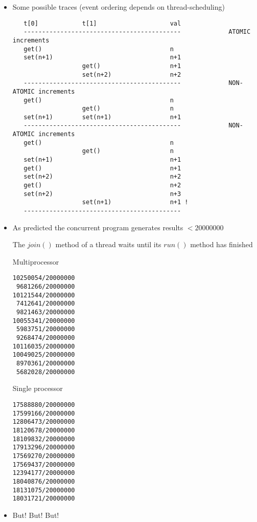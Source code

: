 \documentclass{concdistfoils}
\begin{document}
\begin{slide}
\begin{itemize}
\item Some possible traces (event ordering depends on thread-scheduling)
\vfill
\begin{smaller}
\begin{verbatim}
   t[0]            t[1]                    val
   -------------------------------------------             ATOMIC increments
   get()                                   n
   set(n+1)                                n+1
                   get()                   n+1
                   set(n+2)                n+2
   -------------------------------------------             NON-ATOMIC increments  
   get()                                   n
                   get()                   n
   set(n+1)        set(n+1)                n+1
   -------------------------------------------             NON-ATOMIC increments
   get()                                   n
                   get()                   n
   set(n+1)                                n+1
   get()                                   n+1
   set(n+2)                                n+2
   get()                                   n+2
   set(n+2)                                n+3
                   set(n+1)                n+1 !
   -------------------------------------------
\end{verbatim}
\end{smaller}
\end{itemize}
\end{slide}

\begin{slide}
\begin{itemize}
\item As predicted the concurrent program generates results $<20000000$
\begin{note}
The $join()$ method of a thread waits until its $run()$ method has finished
\end{note}
\vfill

\hfill
\begin{minipage}{3.5in}
Multiprocessor 
\begin{verbatim}
10250054/20000000
 9681266/20000000
10121544/20000000
 7412641/20000000
 9821463/20000000
10055341/20000000
 5983751/20000000
 9268474/20000000
10116035/20000000
10049025/20000000
 8970361/20000000
 5682028/20000000
\end{verbatim}
\end{minipage}
\hfill
\begin{minipage}{3.5in}
Single processor
\begin{verbatim}
17588880/20000000
17599166/20000000
12806473/20000000
18120678/20000000
18109832/20000000
17913296/20000000
17569270/20000000
17569437/20000000
12394177/20000000
18040876/20000000
18131075/20000000
18031721/20000000
\end{verbatim}
\end{minipage}
\hfill
\vfill 
\item But! But! But! 
\end{itemize}
\end{slide}
\end{document}
